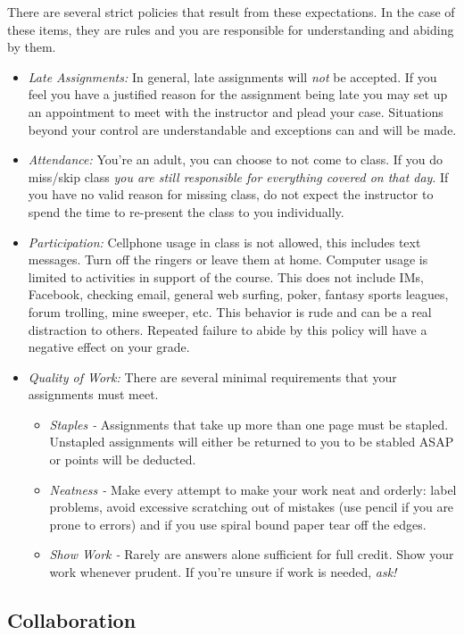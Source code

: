 \documentclass[10pt]{article}
\begin{document}
There are several strict policies that result from these expectations.  In the case of these items, they are rules and you are responsible for understanding and abiding by them.
\begin{itemize}
\item \textit{Late Assignments: }In general, late assignments will \textit{not} be accepted.  If you feel you have a justified reason for the assignment being late you may set up an appointment to meet with the instructor and plead your case.  Situations beyond your control are understandable and exceptions can and will be made.
\item \textit{Attendance: }You're an adult, you can choose to not come to class.  If you do miss/skip class \textit{you are still responsible for everything covered on that day}.  If you have no valid reason for missing class, do not expect the instructor to spend the time to re-present the class to you individually.
\item \textit{Participation: }  Cellphone usage in class is not allowed, this includes text messages.  Turn off the ringers or leave them at home.  Computer usage is limited to activities in support of the course.  This does not include IMs, Facebook, checking email, general web surfing, poker, fantasy sports leagues, forum trolling, mine sweeper, etc.  This behavior is rude and can be a real distraction to others.  Repeated failure to abide by this policy will have a negative effect on your grade.  
\item \textit{Quality of Work:} There are several minimal requirements that your assignments must meet.
\begin{itemize}
\item \textit{Staples - } Assignments that take up more than one page must be stapled.  Unstapled assignments will either be returned to you to be stabled ASAP or points will be deducted.  
\item \textit{Neatness - }  Make every attempt to make your work neat and orderly:  label problems, avoid excessive scratching out of mistakes (use pencil if you are prone to errors) and if you use spiral bound paper tear off the edges. 
\item \textit{Show Work - } Rarely are answers alone sufficient for full credit.  Show your work whenever prudent.  If you're unsure if work is needed, \textit{ask!}
\end{itemize}
\end{itemize}

\subsection{Collaboration}
\end{document}
